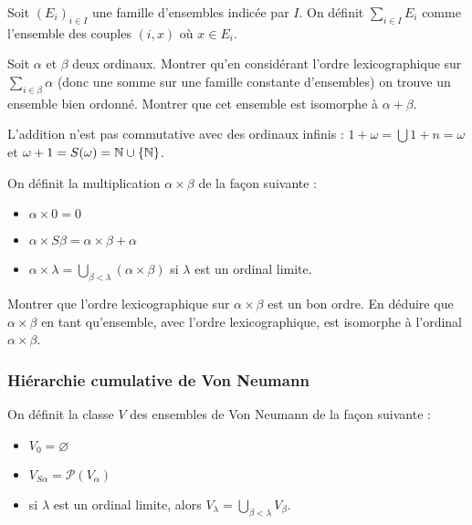 \begin{exo}
    Soit $(E_i)_{i\in I}$ une famille d'ensembles indicée par $I$. On définit $\displaystyle{\sum_{i\in I}E_i}$ comme l'ensemble des couples $(i,x)$ où $x\in E_i$.

    Soit $\alpha$ et $\beta$ deux ordinaux. Montrer qu'en considérant l'ordre lexicographique sur $\sum_{i \in \beta} \alpha$ (donc une somme sur une famille constante d'ensembles) on trouve un ensemble bien ordonné. Montrer que cet ensemble est isomorphe à $\alpha + \beta$.
\end{exo}

\begin{rmk}
    L'addition n'est pas commutative avec des ordinaux infinis : $1+\omega = \bigcup 1+n = \omega$ et $\omega + 1 = S(\omega) = \mathbb{N}\cup\{\mathbb{N}\}$.
\end{rmk}

\begin{defi}
    On définit la multiplication $\alpha \times \beta$ de la façon suivante :
    \begin{itemize}[label=$\bullet$]
        \item $\alpha \times 0 = 0$
        \item $\alpha \times S \beta = \alpha \times \beta + \alpha$
        \item $\alpha \times \lambda = \displaystyle{\bigcup_{\beta < \lambda}(\alpha \times \beta)}$ si $\lambda$ est un ordinal limite.
    \end{itemize}
\end{defi}

\begin{exo}
    Montrer que l'ordre lexicographique sur $\alpha \times \beta$ est un bon ordre. En déduire que $\alpha \times \beta$ en tant qu'ensemble, avec l'ordre lexicographique, est isomorphe à l'ordinal $\alpha \times \beta$.
\end{exo}

\subsubsection{Hiérarchie cumulative de Von Neumann}

On définit la classe $V$ des ensembles de Von Neumann de la façon suivante :

\begin{itemize}[label=$\bullet$]
    \item $V_0 = \varnothing$
    \item $V_{S \alpha} = \mathcal P (V_\alpha)$
    \item si $\lambda$ est un ordinal limite, alors $V_{\lambda} = \bigcup_{\beta < \lambda} V_\beta$.
\end{itemize}

